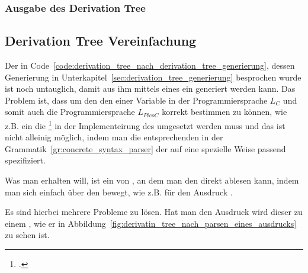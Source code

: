 \subsubsection{Ausgabe des Derivation Tree}


\subsection{Derivation Tree Vereinfachung}
\label{sec:derivation_tree_vereinfachung}

Der  in Code~\ref{code:derivation_tree_nach_derivation_tree_generierung}, dessen Generierung in Unterkapitel~\ref{sec:derivation_tree_generierung} besprochen wurde ist noch untauglich, damit aus ihm mittels eines  ein  generiert werden kann. Das Problem ist, dass um den den  einer Variable in der Programmiersprache $L_C$ und somit auch die Programmiersprache $L_{PicoC}$ korrekt bestimmen zu können, wie z.B. ein   die \footcite{noauthor_clockwisespiral_nodate} in der Implementeirung des  umgesetzt werden muss und das ist nicht alleinig möglich, indem man die entsprechenden  in der Grammatik~\ref{gr:concrete_syntax_parser} der  auf eine spezielle Weise passend spezifiziert.

Was man erhalten will, ist ein  von , an dem man den  direkt ablesen kann, indem man sich einfach über den  bewegt, wie z.B.  für den Ausdruck .

Es sind hierbei mehrere Probleme zu lösen. Hat man den Ausdruck  wird dieser zu einem  , wie er in Abbildung~\ref{fig:derivatin_tree_nach_parsen_eines_ausdrucks} zu sehen ist.

